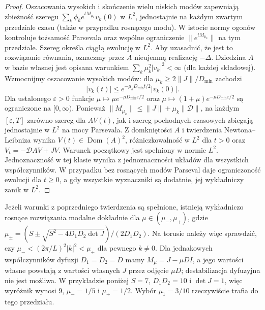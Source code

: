 \begin{proof}
Oszacowania wysokich i skończenie wielu niskich
modów zapewniają zbieżność szeregu
$\sum_k\phi_k e^{tM_{\mu_k}}v_k(0)$ w $L^2$,
jednostajnie na każdym zwartym przedziale czasu
(także w przypadku rosnącego modu).
W istocie normy ogonów kontroluje tożsamość
Parsevala oraz wspólne ograniczenie
$\|e^{tM_{\mu_k}}\|$ na tym przedziale.
Szereg określa ciągłą ewolucję w $L^2$.
Aby uzasadnić, że jest to rozwiązanie równania,
oznaczmy przez $A$ nieujemną realizację $-\Delta$.
Dziedzina $A$ w bazie własnej jest opisana warunkiem
$\sum_k\mu_k^2|v_k|^2<\infty$ (dla każdej składowej).
Wzmocnijmy oszacowanie wysokich modów:
dla $\mu_k\ge2\|J\|/D_{\min}$ zachodzi
\[
 |v_k(t)|\le e^{-\mu_k D_{\min}t/2}|v_k(0)|.
\]
Dla ustalonego $\varepsilon>0$ funkcje
$\mu\mapsto\mu e^{-\mu D_{\min}\varepsilon/2}$
oraz $\mu\mapsto(1+\mu)e^{-\mu D_{\min}\varepsilon/2}$
są ograniczone na $[0,\infty)$.
Ponieważ $\|M_{\mu_k}\|\le\|J\|+\mu_k\|\mathcal D\|$,
na każdym $[\varepsilon,T]$ zarówno szereg dla
$AV(t)$, jak i szereg pochodnych czasowych
zbiegają jednostajnie w $L^2$ na mocy Parsevala.
Z domkniętości $A$ i twierdzenia Newtona--Leibniza
wynika $V(t)\in\operatorname{Dom}(A)^2$,
różniczkowalność w $L^2$ dla $t>0$ oraz
$V_t=-\mathcal D AV+JV$. Warunek początkowy
jest spełniony w normie $L^2$.
Jednoznaczność w tej klasie wynika z jednoznaczności
układów dla wszystkich współczynników.
W przypadku bez rosnących modów Parseval daje
ograniczoność ewolucji dla $t\ge0$, a gdy wszystkie
wyznaczniki są dodatnie, jej wykładniczy zanik
w $L^2$.
\end{proof}

\begin{uwaga}
Jeżeli warunki z poprzedniego twierdzenia są spełnione,
istnieją wykładniczo rosnące rozwiązania modalne
dokładnie dla
$\mu\in(\mu_-,\mu_+)$, gdzie
$\mu_\pm=(S\pm\sqrt{S^2-4D_1D_2\det J})/(2D_1D_2)$.
Na torusie należy więc sprawdzić, czy
$\mu_-<(2\pi/L)^2|k|^2<\mu_+$ dla pewnego $k\ne0$.
Dla jednakowych współczynników dyfuzji $D_1=D_2=D$
mamy $M_\mu=J-\mu DI$, a jego wartości własne
powstają z wartości własnych $J$ przez odjęcie
$\mu D$; destabilizacja dyfuzyjna nie jest możliwa.
W przykładzie poniżej $S=7$, $D_1D_2=10$ i
$\det J=1$, więc wyróżnik wynosi $9$,
$\mu_-=1/5$ i $\mu_+=1/2$.
Wybór $\mu_1=3/10$ rzeczywiście trafia do tego przedziału.
\end{uwaga}


